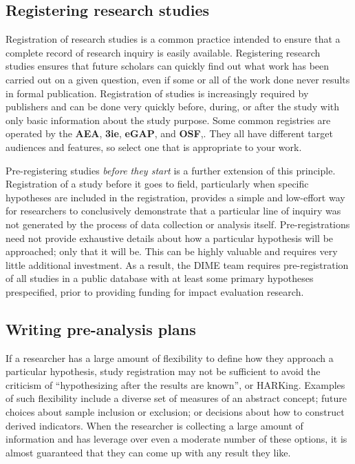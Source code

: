 \subsection{Registering research studies}

Registration of research studies is a common practice
intended to ensure that a complete record of research inquiry is easily available.
Registering research studies ensures that future scholars can quickly
find out what work has been carried out on a given question,
even if some or all of the work done never results in formal publication.
Registration of studies is increasingly required by publishers
and can be done very quickly before, during, or after the study
with only basic information about the study purpose.
Some common registries are operated by the \textbf{AEA},
\textbf{3ie},
\textbf{eGAP},
and \textbf{OSF},.
They all have different target audiences and features,
so select one that is appropriate to your work.

Pre-registering studies \textit{before they start} is a further extension of this principle.\cite{nosek2018preregistration}
Registration of a study before it goes to field,
particularly when specific hypotheses are included in the registration,
provides a simple and low-effort way for researchers
to conclusively demonstrate that a particular line of inquiry
was not generated by the process of data collection or analysis itself.
Pre-registrations need not provide exhaustive details about how
a particular hypothesis will be approached; only that it will be.
This can be highly valuable and requires very little additional investment.
As a result, the DIME team requires pre-registration of all studies
in a public database with at least some primary hypotheses prespecified,
prior to providing funding for impact evaluation research.

\subsection{Writing pre-analysis plans}

If a researcher has a large amount of flexibility
to define how they approach a particular hypothesis,
study registration may not be sufficient to avoid the criticism of
``hypothesizing after the results are known'', or HARKing.\cite{kerr1998harking}
Examples of such flexibility include a diverse set of measures of an abstract concept;
future choices about sample inclusion or exclusion;
or decisions about how to construct derived indicators.
When the researcher is collecting a large amount of information
and has leverage over even a moderate number of these options,
it is almost guaranteed that they can come up with any result they like.\cite{gelman2013garden}

